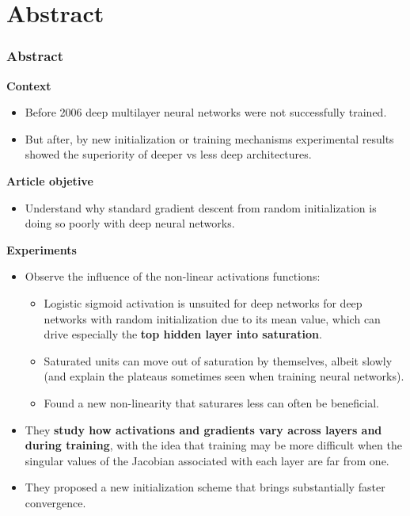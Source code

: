 \section{Abstract}
\begin{frame}
  \frametitle{Abstract}

  \textbf{Context}
  \begin{itemize}
    \item Before 2006 deep multilayer neural networks were not successfully trained. 
    \item But after, by new initialization or training mechanisms experimental results showed the superiority of deeper vs less deep architectures. 
  \end{itemize}

  \textbf{Article objetive}
  \begin{itemize}
    \item Understand why standard gradient descent from random initialization is doing so poorly with deep neural networks. 
  \end{itemize}

  
\end{frame}
    
\begin{frame}
  
  \textbf{Experiments}
  \begin{itemize}
    \item Observe the influence of the non-linear activations functions:
    \begin{itemize}
      \item Logistic sigmoid activation is unsuited for deep networks for deep networks with random initialization due to its mean value, which can drive especially the \textbf{top hidden layer into saturation}. 
      \item Saturated units can move out of saturation by themselves, albeit slowly (and explain the plateaus sometimes seen when training neural networks). 
      \item Found a new non-linearity that saturares less can often be beneficial. 
  \end{itemize}
    \item They \textbf{study how activations and gradients vary across layers and during training}, with the idea that training may be more difficult when the singular values of the Jacobian associated with each layer are far from one. 
    \item They proposed a new initialization scheme that brings substantially faster convergence. 
  \end{itemize}
  
\end{frame}


